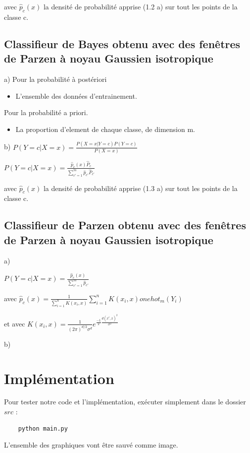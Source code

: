 \documentclass[a4paper,10pt]{article}
\begin{document}
avec $ \hat{p}_{c}(x) $ la densité de probabilité apprise (1.2 a) sur tout les points de la classe c.

\subsection{Classifieur de Bayes obtenu avec des fenêtres de Parzen à noyau Gaussien isotropique}

a) Pour la probabilité à postériori
\begin{itemize}
	\item L'ensemble des données d'entrainement.
\end{itemize}

Pour la probabilité a priori.
\begin{itemize}
	\item La proportion d'element de chaque classe, de dimension m.
\end{itemize}

b) $P(Y=c | X=x)  = \frac{P(X=x | Y=c) P(Y=c)}{P(X=x)} $

$P(Y=c | X=x)  = \frac{ \hat{p}_{c}(x) \hat{P}_{c}}{ \sum_{c'=1}^{m} \hat{p}_{c'} \hat{P}_{c'} } $

avec $ \hat{p}_{c}(x) $ la densité de probabilité apprise (1.3 a) sur tout les points de la classe c.


\subsection{Classifieur de Parzen obtenu avec des fenêtres de Parzen à noyau Gaussien isotropique}

a)

$P(Y=c | X=x)  = \frac{ \hat{p}_{c}(x) }{ \sum_{c'=1}^{m} \hat{p}_{c'} } $

avec $ \hat{p}_{c}(x) =  \frac{1}{ \sum_{i=1}^{n} K(x_{i}, x) } \sum_{i=1}^{n} K(x_{i}, x) onehot_{m}(Y_{i}) $

et avec $ K(x_{i}, x) = \frac{1}{ (2 \pi)^{d/2} \sigma^{d}}  e^{ \frac{-1}{2} \frac{d(x^{i},x)^{2}}{\sigma^{2}}} $ 


b)

\section{Implémentation}

Pour tester notre code et l'implémentation, exécuter simplement dans le dossier $src$ :
\begin{verbatim}
	python main.py
\end{verbatim}
L'ensemble des graphiques vont être sauvé comme image.
\end{document}
